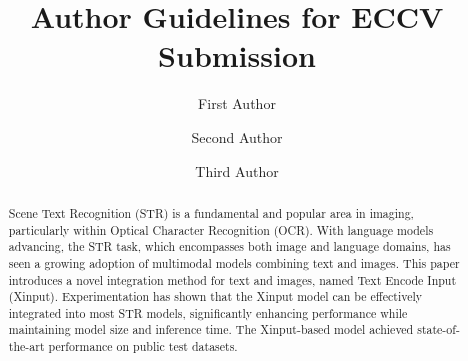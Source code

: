 \documentclass[runningheads]{llncs}
\begin{document}
\title{Author Guidelines for ECCV Submission} 


\author{First Author \and
Second Author \and
Third Author}



\maketitle


\begin{abstract}
  Scene Text Recognition (STR) is a fundamental and popular area in imaging, particularly within Optical Character Recognition (OCR).	With language models advancing, the STR task, which encompasses both image and language domains, has seen a growing adoption of multimodal models combining text and images.	This paper introduces a novel integration method for text and images, named Text Encode Input (Xinput).	Experimentation has shown that the Xinput model can be effectively integrated into most STR models, significantly enhancing performance while maintaining model size and inference time.	The Xinput-based model achieved state-of-the-art performance on public test datasets.	
\end{abstract}
\end{document}
